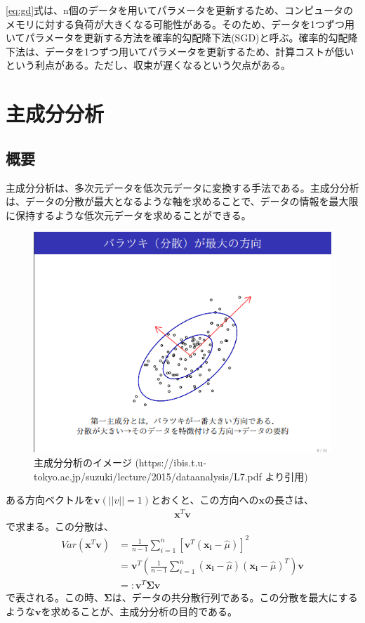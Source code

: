 \documentclass{ltjsarticle}
\begin{document}
\ref{eq:gd}式は、n個のデータを用いてパラメータを更新するため、コンピュータのメモリに対する負荷が大きくなる可能性がある。そのため、データを1つずつ用いてパラメータを更新する方法を確率的勾配降下法(SGD)と呼ぶ。確率的勾配降下法は、データを1つずつ用いてパラメータを更新するため、計算コストが低いという利点がある。ただし、収束が遅くなるという欠点がある。

\newpage

\section{主成分分析}
\subsection{概要}
主成分分析は、多次元データを低次元データに変換する手法である。主成分分析は、データの分散が最大となるような軸を求めることで、データの情報を最大限に保持するような低次元データを求めることができる。

\begin{figure}[htbp]
  \centering
  \includegraphics[width=13cm]{main_element.png}
  \caption{主成分分析のイメージ (https://ibis.t.u-tokyo.ac.jp/suzuki/lecture/2015/dataanalysis/L7.pdf より引用)}
\end{figure}

ある方向ベクトルを$\mathbf{v}(||v|| =1)$とおくと、この方向への$\mathbf{x}$の長さは、
\begin{align}
  \mathbf{x}^T\mathbf{v}
\end{align}
で求まる。この分散は、
\begin{align}
  Var(\mathbf{x}^T\mathbf{v}) &= \frac{1}{n-1} \sum_{i=1}^{n}\left[ \mathbf{v}^T (\mathbf{x_i}- \hat{\mu}) \right]^2 \\
  &= \mathbf{v}^T \left( \frac{1}{n-1} \sum_{i=1}^{n} (\mathbf{x_i}- \hat{\mu})(\mathbf{x_i}- \hat{\mu})^T \right) \mathbf{v}\\
  &=: \mathbf{v}^T \mathbf{\Sigma} \mathbf{v} 
\end{align}
で表される。この時、$\mathbf{\Sigma}$は、データの共分散行列である。この分散を最大にするような$\mathbf{v}$を求めることが、主成分分析の目的である。
\end{document}
